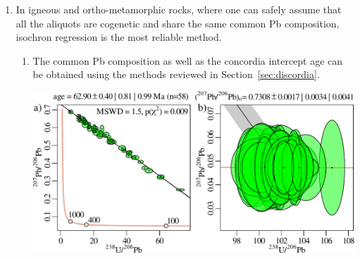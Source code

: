 \begin{refsection}
\begin{enumerate}
\item In igneous and ortho-metamorphic rocks, where one can safely
  assume that all the aliquots are cogenetic and share the same common
  Pb composition, isochron regression is the most reliable method.
  \begin{enumerate}
  \item\label{it:isochroncommonpb} The common Pb composition as well
    as the concordia intercept age can be obtained using the methods
    reviewed in Section~\ref{sec:discordia}.\\
    
    \noindent\begin{minipage}[t]{\linewidth}
    \centering
    \includegraphics[width=.8\textwidth]{../figures/commonPbisochron13.pdf}
    \end{minipage}
    \begin{minipage}[t]{\linewidth}
      \centering
      \captionsetup{width=.8\textwidth}
    \label{fig:commonPbisochron13}
    \end{minipage}


\end{enumerate}
\end{enumerate}
\end{refsection}
